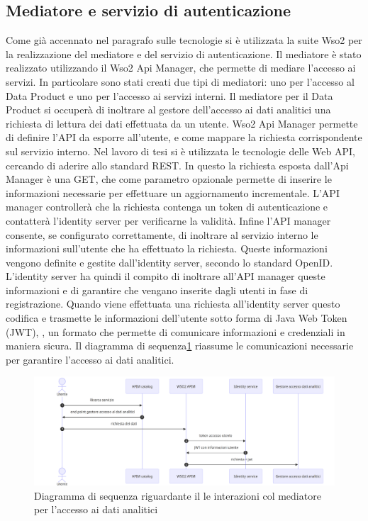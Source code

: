 \documentclass[12pt]{report}
\begin{document}
\subsection{Mediatore e servizio di autenticazione}
Come già accennato nel paragrafo sulle tecnologie si è utilizzata la suite Wso2 per la realizzazione del mediatore e del servizio di autenticazione.
Il mediatore è stato realizzato utilizzando il Wso2 Api Manager, che permette di mediare l'accesso ai servizi.
In particolare sono stati creati due tipi di mediatori: uno per l'accesso al Data Product e uno per l'accesso ai servizi interni.
Il mediatore per il Data Product si occuperà di inoltrare al gestore dell'accesso ai dati analitici una richiesta di lettura dei dati effettuata da un utente.
Wso2 Api Manager permette di definire l'API da esporre all'utente, e come mappare la richiesta corrispondente sul servizio interno. 
Nel lavoro di tesi si è utilizzata le tecnologie delle Web API, cercando di aderire allo standard REST.
In questo la richiesta esposta dall'Api Manager è una GET, che come parametro opzionale permette di inserire le informazioni necessarie per effettuare un aggiornamento incrementale.
L'API manager controllerà che la richiesta contenga un token di autenticazione e contatterà l'identity server per verificarne la validità.
Infine l'API manager consente, se configurato correttamente, di inoltrare al servizio interno le informazioni sull'utente che ha effettuato la richiesta. 
Queste informazioni vengono definite e gestite dall'identity server, secondo lo standard OpenID.
L'identity server ha quindi il compito di inoltrare all'API manager queste informazioni e di garantire che vengano inserite dagli utenti in fase di registrazione.
Quando viene effettuata una richiesta all'identity server questo codifica e trasmette le informazioni dell'utente sotto forma di Java Web Token (JWT), \cite{jwt_documentation}, un formato che permette di comunicare informazioni e credenziali in maniera sicura.
Il diagramma di sequenza\ref{funzionamento mediatore} riassume le comunicazioni necessarie per garantire l'accesso ai dati analitici.
\begin{figure}
    \centering
    \includegraphics[width=\linewidth]{immagini/Funzionamento mediatore dati analitci.png}
    \caption{Diagramma di sequenza riguardante il le interazioni col mediatore per l'accesso ai dati analitici }
    \label{funzionamento mediatore}
\end{figure}
\end{document}
